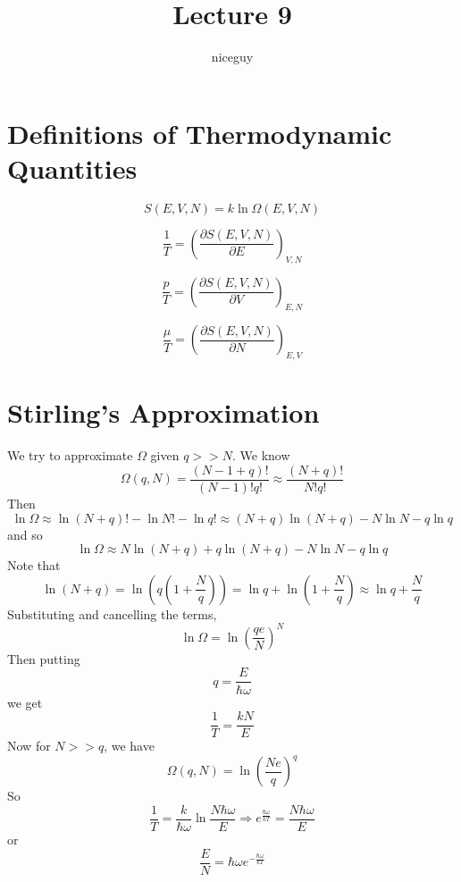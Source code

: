 \documentclass[12pt]{article}
\author{niceguy}
\title{Lecture 9}
\begin{document}
\maketitle

\section{Definitions of Thermodynamic Quantities}

\begin{defn}[Entropy]
	$$S(E,V,N) = k\ln\Omega(E,V,N)$$
\end{defn}

\begin{defn}[Temperature]
	$$\frac{1}{T} = \left(\frac{\partial S(E,V,N)}{\partial E}\right)_{V,N}$$
\end{defn}

\begin{defn}[Pressure]
	$$\frac{p}{T} = \left(\frac{\partial S(E,V,N)}{\partial V}\right)_{E,N}$$
\end{defn}

\begin{defn}
	$$\frac{\mu}{T} = \left(\frac{\partial S(E,V,N)}{\partial N}\right)_{E,V}$$
\end{defn}

\section{Stirling's Approximation}

We try to approximate $\Omega$ given $q >> N$.
We know
$$\Omega(q,N) = \frac{(N-1+q)!}{(N-1)!q!} \approx \frac{(N+q)!}{N!q!}$$
Then
$$\ln\Omega \approx \ln(N+q)! - \ln N! - \ln q! \approx (N+q)\ln(N+q) - N\ln N - q\ln q$$
and so
$$\ln\Omega \approx N\ln(N+q) + q\ln(N+q) - N\ln N - q\ln q$$
Note that
$$\ln(N+q) = \ln\left(q\left(1+\frac{N}{q}\right)\right) = \ln q + \ln\left(1+\frac{N}{q}\right) \approx \ln q + \frac{N}{q}$$
Substituting and cancelling the terms,
$$\ln\Omega = \ln\left(\frac{qe}{N}\right)^N$$
Then putting
$$q = \frac{E}{\hbar\omega}$$
we get
$$\frac{1}{T} = \frac{kN}{E}$$
Now for $N >> q$, we have
$$\Omega(q,N) = \ln\left(\frac{Ne}{q}\right)^q$$
So
$$\frac{1}{T} = \frac{k}{\hbar\omega}\ln\frac{N\hbar\omega}{E} \Rightarrow e^{\frac{\hbar\omega}{kT}} = \frac{N\hbar\omega}{E}$$
or
$$\frac{E}{N} = \hbar\omega e^{-\frac{\hbar\omega}{kT}}$$
\end{document}

